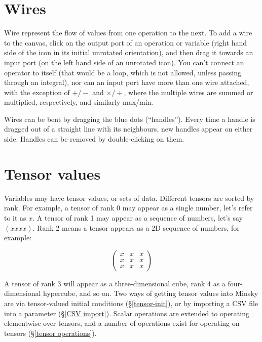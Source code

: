 \section{Wires}

Wire represent the flow of values from one operation to the next. To
add a wire to the canvas, click on the output port of an operation or
variable (right hand side of the icon in its initial unrotated
orientation), and then drag it towards an input port (on the left hand
side of an unrotated icon). You can't connect an operator to itself
(that would be a loop, which is not allowed, unless passing through an
integral), nor can an input port have more than one wire
attached, with the exception of $+/-$ and $\times/\div$, where the
multiple wires are summed or multiplied, respectively, and similarly max/min.

Wires can be bent by dragging the blue dots (``handles''). Every time
a handle is dragged out of a straight line with its neighbours, new
handles appear on either side. Handles can be removed by
double-clicking on them.

\section{Tensor values}

Variables may have tensor values, or sets of data. Different tensors
are sorted by rank. For example, a tensor of rank 0 may appear as a
single number, let's refer to it as $x$. A tensor of rank 1 may appear
as a sequence of numbers, let's say $(x x x x)$. Rank 2 means a tensor
appears as a 2D sequence of numbers, for example:

\begin{displaymath}
  \left(
  \begin{array}{ccc}
    x& x& x\\
    x& x& x\\
    x& x& x
  \end{array}
  \right)
\end{displaymath}

A tensor of rank 3 will appear as a three-dimensional cube,
rank 4 as a four-dimensional hypercube, and so on. Two 
ways of getting tensor values into Minsky are via tensor-valued 
initial conditions (\S\ref{tensor-init}), or by importing a CSV 
file into a parameter (\S\ref{CSV import}). Scalar 
operations are extended to operating elementwise over tensors, 
and a number of operations exist for operating on tensors 
(\S\ref{tensor operations}).

